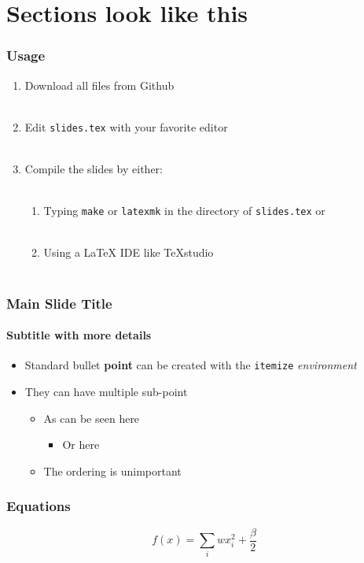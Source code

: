 \section{Sections look like this}

\begin{frame}
    \frametitle{Usage}

    \begin{enumerate}
        \item Download all files from Github\\~
        \item Edit \texttt{slides.tex} with your favorite editor\\~
        \item Compile the slides by either:\\~
        \begin{enumerate}
            \item Typing \texttt{make} or \texttt{latexmk} in the directory of \texttt{slides.tex} or\\~
            \item Using a LaTeX IDE like TeXstudio\\~
        \end{enumerate}
    \end{enumerate}
\end{frame}

\begin{frame}
    \frametitle{Main Slide Title}
    \framesubtitle{Subtitle with more details}

    \begin{itemize}
        \item Standard bullet \textbf{point} can be created with the \texttt{itemize} \textit{environment}
        \item They can have multiple sub-point
        \begin{itemize}
            \item As can be seen here
            \begin{itemize}
                \item Or here
            \end{itemize}
            \item The ordering is unimportant
        \end{itemize}
    \end{itemize}
\end{frame}

\begin{frame}
\frametitle{Equations}

    \begin{equation*}
        f(x) = \sum_i wx_i^2 + \frac{\beta}{2}
    \end{equation*}
\end{frame}

